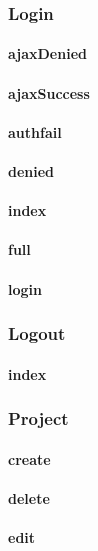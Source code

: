 \documentclass[12pt]{article}
\begin{document}
\subsubsection{Login}
\paragraph{ajaxDenied}
\paragraph{ajaxSuccess}
\paragraph{authfail}
\paragraph{denied}
\paragraph{index}
\paragraph{full}
\paragraph{login}

\subsubsection{Logout}
\paragraph{index}

\subsubsection{Project}
\paragraph{create}
\paragraph{delete}
\paragraph{edit}
\end{document}
